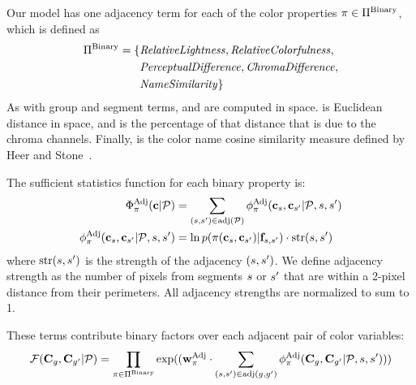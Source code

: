 
Our model has one adjacency term for each of the color properties $ \pi \in \Pi^{\textrm{Binary}}$, which is defined as
\begin{align*}
\Pi^{\textrm{Binary}} = \{ &\text{\emph{RelativeLightness}}, \text{\emph{RelativeColorfulness}}, \\
                  &\text{\emph{PerceptualDifference}}, \text{\emph{ChromaDifference}}, \\
                  &\text{\emph{NameSimilarity}} \}
\end{align*}
As with group and segment terms,  and  are computed in \lab space.  is Euclidean distance in \lab space, and  is the percentage of that distance that is due to the chroma channels. Finally,  is the color name cosine similarity measure defined by Heer and Stone~.

The sufficient statistics function for each binary property is:
 \begin{align*}
 \Phi^{\textrm{Adj}}_\pi(\mathbf{c} | \mathcal{P}) &= \sum_{(s, {s^{\prime}}) \in \text{adj}(\mathcal{P})} \phi^{\textrm{Adj}}_\pi(\mathbf{c}_s, \mathbf{c}_{s^{\prime}} | \mathcal{P}, s, {s^{\prime}}) \\
 \phi^{\textrm{Adj}}_\pi(\mathbf{c}_s, \mathbf{c}_{s^{\prime}} | \mathcal{P}, s, {s^{\prime}}) &= \ln p( \pi( \mathbf{c}_s, \mathbf{c}_{s^{\prime}} ) | \mathbf{f}_{s, {s^{\prime}}} ) \cdot \text{str}(s, {s^{\prime}})
\end{align*}
where $\text{str}(s,{s^{\prime}})$ is the strength of the adjacency $(s,{s^{\prime}})$. We define adjacency strength as the number of pixels from segments $s$ or ${s^{\prime}}$ that are within a 2-pixel distance from their perimeters. All adjacency strengths are normalized to sum to 1.  

These terms contribute binary factors over each adjacent pair of color variables:
\begin{equation*}
 \mathcal{F}(\mathbf{C}_g, \mathbf{C}_{g^{\prime}} | \mathcal{P}) = \prod_{\pi \in \Pi^{\textrm{Binary}}} \exp( (\mathbf{w}^{\textrm{Adj}}_\pi \cdot \sum_{(s, {s^{\prime}}) \in \text{adj}(g, {g^{\prime}})} \phi^{\textrm{Adj}}_\pi( \mathbf{C}_g, \mathbf{C}_{g^{\prime}} | \mathcal{P}, s, {s^{\prime}}))) 
\end{equation*}


